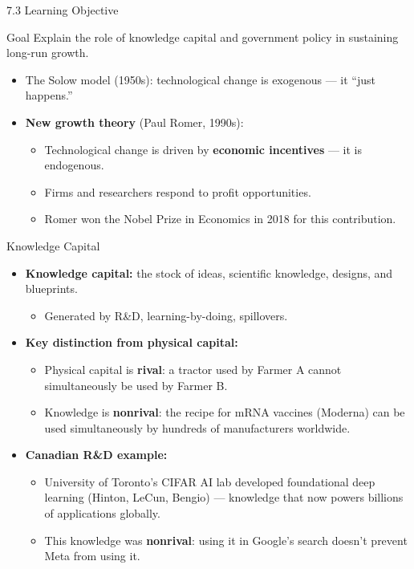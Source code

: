 \documentclass[aspectratio=169]{beamer}
\begin{document}
\begin{frame}{7.3 Learning Objective}
\transfade
\begin{block}{Goal}
Explain the role of knowledge capital and government policy in sustaining long-run growth.
\end{block}
\begin{itemize}
  \item The Solow model (1950s): technological change is exogenous --- it ``just happens.''
  \item \textbf{New growth theory} (Paul Romer, 1990s):
  \begin{itemize}
    \item Technological change is driven by \textbf{economic incentives} --- it is endogenous.
    \item Firms and researchers respond to profit opportunities.
    \item Romer won the \alert{Nobel Prize in Economics in 2018} for this contribution.
  \end{itemize}
\end{itemize}
\end{frame}

\begin{frame}{Knowledge Capital}
\transfade
\begin{itemize}
  \item \textbf{Knowledge capital:} the stock of ideas, scientific knowledge, designs, and blueprints.
  \begin{itemize}
    \item Generated by R\&D, learning-by-doing, spillovers.
  \end{itemize}
  \item \textbf{Key distinction from physical capital:}
  \begin{itemize}
    \item Physical capital is \textbf{rival}: a tractor used by Farmer A cannot simultaneously be used by Farmer B.
    \item Knowledge is \textbf{nonrival}: the recipe for mRNA vaccines (Moderna) can be used simultaneously by hundreds of manufacturers worldwide.
  \end{itemize}
  \item \textbf{Canadian R\&D example:}
  \begin{itemize}
    \item University of Toronto's CIFAR AI lab developed foundational deep learning (Hinton, LeCun, Bengio) --- knowledge that now powers billions of applications globally.
    \item This knowledge was \textbf{nonrival}: using it in Google's search doesn't prevent Meta from using it.
  \end{itemize}
\end{itemize}
\end{frame}
\end{document}
